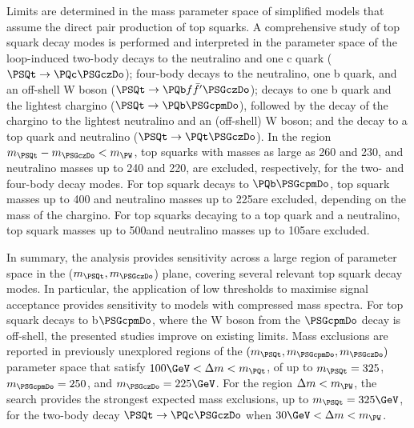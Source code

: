 Limits are determined in the mass parameter space of simplified models
that assume the direct pair production of top squarks. A comprehensive
study of top squark decay modes is performed and interpreted in the
parameter space of the loop-induced two-body decays to the neutralino
and one c quark ($\PSQt \to \PQc\PSGczDo$); four-body decays to the
neutralino, one b quark, and an off-shell W boson ($\PSQt \to {\PQb
  \ffbp} \PSGczDo$); decays to one b quark and the lightest chargino
($\PSQt \to \PQb \PSGcpmDo$), followed by the decay of the chargino to
the lightest neutralino and an (off-shell) W boson; and the decay to a
top quark and neutralino ($\PSQt \to \PQt \PSGczDo$). In the region
$m_{\PSQt} - m_{\PSGczDo} < m_{\PW}$, top squarks with masses as large
as 260 and 230\GeV, and neutralino masses up to 240 and 220\GeV, are
excluded, respectively, for the two- and four-body decay modes. For
top squark decays to $\PQb\PSGcpmDo$, top squark masses up to 400\GeV
and neutralino masses up to 225\GeV are excluded, depending on the
mass of the chargino. For top squarks decaying to a top quark and a
neutralino, top squark masses up to 500\GeV and neutralino masses up
to 105\GeV are excluded.

In summary, the analysis provides sensitivity across a large region of
parameter space in the ($m_{\PSQt}, m_{\PSGczDo}$) plane, covering
several relevant top squark decay modes. In particular, the
application of low thresholds to maximise signal acceptance provides
sensitivity to models with compressed mass spectra. For top squark
decays to b$\PSGcpmDo$, where the W boson from the $\PSGcpmDo$ decay
is off-shell, the presented studies improve on existing limits.  Mass
exclusions are reported in previously unexplored regions of the
$(m_{\PSQt}, m_{\PSGcpmDo}, m_{\PSGczDo})$ parameter space that
satisfy $100\GeV < \dm < m_\PQt$, of up to $m_{\PSQt} = 325$,
$m_{\PSGcpmDo} = 250$, and $m_{\PSGczDo} = 225\GeV$. For the region
$\dm < m_\PW$, the search provides the strongest expected mass
exclusions, up to $m_{\PSQt} = 325\GeV$, for the two-body decay $\PSQt
\to \PQc\PSGczDo$ when $30\GeV < \dm < m_\PW$.

